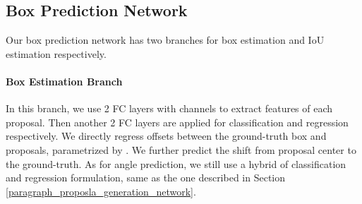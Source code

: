 \documentclass[10pt,twocolumn,letterpaper]{article}
\begin{document}
\subsection{Box Prediction Network}
Our box prediction network has two branches for box estimation and IoU estimation respectively.

\vspace{-0.1in}
\paragraph{Box Estimation Branch}
In this branch, we use 2 FC layers with channels  to extract features of each proposal. Then another 2 FC layers are applied for classification and regression respectively. We directly regress offsets between the ground-truth box and proposals, parametrized by . We further predict the shift  from proposal center to the ground-truth. As for angle prediction, we still use a hybrid of classification and regression formulation, same as the one described in Section \ref{paragraph_proposla_generation_network}.

\begin{comment}
\begin{algorithm}[bpt]
\caption{3D-Bev IoU guided Ensemble.}\label{iou_guided_ensemble}
\begin{algorithmic}[1]
\REQUIRE ~~\\
 \\ 
: the set of detected 3D bounding boxes. \\
: prediced 3D and BEV IoU for each box. \\
: classification score for each box. \\
: IoU for NMS threshold. \\
\ENSURE ~~\\
: the predicted 3D bounding boxes. \\
: the predicted classification score. \\
\STATE  \\ 
\label{ code:fram:1 }
\WHILE{}
\STATE 
\STATE  
\STATE 
\STATE 
\STATE 
\FOR{}
\IF{}
\STATE 
\IF{}
\STATE 
\STATE 
\ENDIF
\label{ code:fram:2 }
\ENDIF
\label{ code:fram:3 }
\ENDFOR
\label{ code:fram:4 }
\STATE 
\STATE 
\ENDWHILE
\label{code:fram:5 }
\RETURN ;
\end{algorithmic}
\end{algorithm}
\end{comment}
\end{document}
